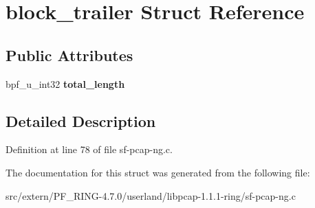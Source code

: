 \hypertarget{structblock__trailer}{
\section{block\_\-trailer Struct Reference}
\label{structblock__trailer}
}
\subsection*{Public Attributes}
\begin{DoxyCompactItemize}
\item 
\hypertarget{structblock__trailer_a6b2015281409a152b5877940835c0b77}{
bpf\_\-u\_\-int32 {\bfseries total\_\-length}}
\label{structblock__trailer_a6b2015281409a152b5877940835c0b77}

\end{DoxyCompactItemize}


\subsection{Detailed Description}


Definition at line 78 of file sf-\/pcap-\/ng.c.



The documentation for this struct was generated from the following file:\begin{DoxyCompactItemize}
\item 
src/extern/PF\_\-RING-\/4.7.0/userland/libpcap-\/1.1.1-\/ring/sf-\/pcap-\/ng.c\end{DoxyCompactItemize}
